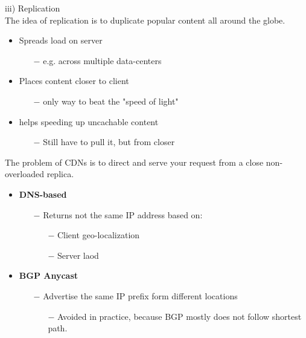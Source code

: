 \documentclass[a4paper, fontsize=8pt, landscape, DIV=1]{scrartcl}
\begin{document}
\begin{multicols*}{4}
		iii) Replication\\
		The idea of replication is to duplicate popular content all around the globe.
		\begin{itemize}[noitemsep]
			\item Spreads load on server
			\begin{itemize}
				\item[$-$] e.g. across multiple data-centers
			\end{itemize}
			\item Places content closer to client
			\begin{itemize}
				\item[$-$] only way to beat the "speed of light"
			\end{itemize}
			\item helps speeding up uncachable content
			\begin{itemize}
				\item[$-$] Still have to pull it, but from closer
			\end{itemize}
		\end{itemize}
		The problem of CDNs is to direct and serve your request from a close
		non-overloaded replica.
		\begin{itemize}[noitemsep]
			\item \textbf{DNS-based}
			\begin{itemize}
				\item[$-$] Returns not the same IP address based on:
				\begin{itemize}
					\item[$-$] Client geo-localization
					\item[$-$] Server laod
				\end{itemize}
			\end{itemize}
			\item \textbf{BGP Anycast}
			\begin{itemize}
				\item[$-$] Advertise the same IP prefix form different locations
				\begin{itemize}
					\item[$-$] Avoided in practice, because BGP mostly does not follow shortest
					path. 
				\end{itemize}
			\end{itemize}
		\end{itemize} 
		

\end{multicols*}
\end{document}
